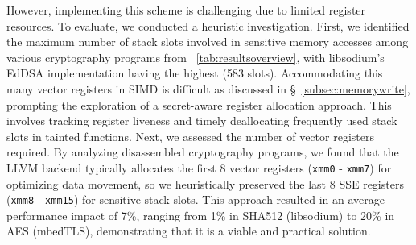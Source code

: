 However, implementing this scheme is challenging due to limited register resources. To evaluate, we conducted a heuristic investigation. 
First, we identified the maximum number of stack slots involved in sensitive memory accesses among various cryptography programs from \T~\ref{tab:resultsoverview}, with libsodium's EdDSA implementation having the highest (583 slots). 
Accommodating this many vector registers in SIMD is difficult as discussed in \S~\ref{subsec:memorywrite}, prompting the exploration of a secret-aware register allocation approach. 
This involves tracking register liveness and timely deallocating frequently used stack slots in tainted functions. 
Next, we assessed the number of vector registers required. 
By analyzing disassembled cryptography programs, we found that the LLVM backend typically allocates the first 8 vector registers (\texttt{xmm0} - \texttt{xmm7}) for optimizing data movement, so we heuristically preserved the last 8 SSE registers (\texttt{xmm8} - \texttt{xmm15}) for sensitive stack slots. 
This approach resulted in an average performance impact of 7\%, ranging from 1\% in SHA512 (libsodium) to 20\% in AES (mbedTLS), demonstrating that it is a viable and practical solution.

